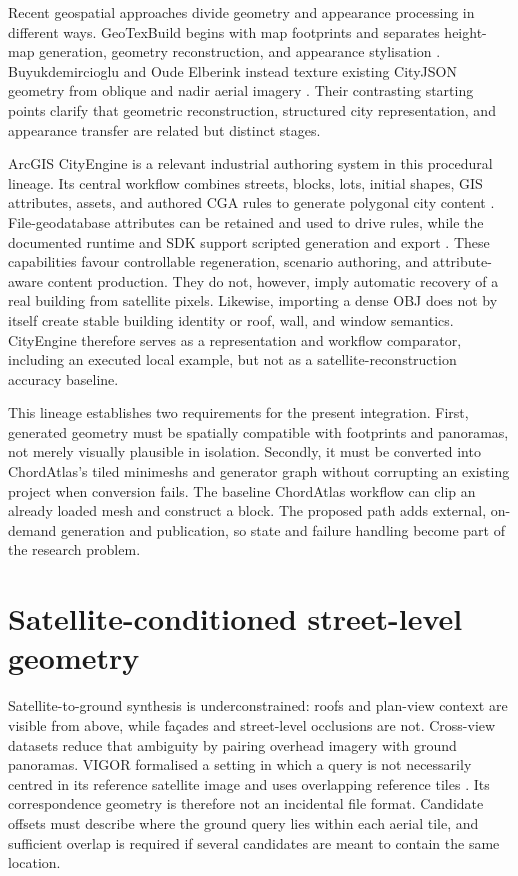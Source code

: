 Recent geospatial approaches divide geometry and appearance processing in
different ways.  GeoTexBuild begins with map footprints and separates
height-map generation, geometry reconstruction, and appearance stylisation
\cite{wang2025geotexbuild}.  Buyukdemircioglu and Oude Elberink instead texture
existing CityJSON geometry from oblique and nadir aerial imagery
\cite{buyukdemircioglu2024texture}.  Their contrasting starting points clarify
that geometric reconstruction, structured city representation, and appearance
transfer are related but distinct stages.

ArcGIS CityEngine is a relevant industrial authoring system in this procedural
lineage.  Its central workflow combines streets, blocks, lots, initial shapes,
GIS attributes, assets, and authored CGA rules to generate polygonal city
content \cite{esriCityEngineIntro2026}.  File-geodatabase attributes can be
retained and used to drive rules, while the documented runtime and SDK support
scripted generation and export \cite{esriCityEngineGIS2026,
esriCityEngineSDK2026}.  These capabilities favour controllable regeneration,
scenario authoring, and attribute-aware content production.  They do not,
however, imply automatic recovery of a real building from satellite pixels.
Likewise, importing a dense OBJ does not by itself create stable building
identity or roof, wall, and window semantics.  CityEngine therefore serves as
a representation and workflow comparator, including an executed local
example, but not as a satellite-reconstruction accuracy baseline.

This lineage establishes two requirements for the present integration.  First,
generated geometry must be spatially compatible with footprints and panoramas,
not merely visually plausible in isolation.  Secondly, it must be converted
into ChordAtlas's tiled \glspl{minimesh} and generator graph without corrupting
an existing project when conversion fails.  The baseline ChordAtlas workflow
can clip an already loaded mesh and construct a block.  The proposed path adds
external, on-demand generation and publication, so state and failure handling
become part of the research problem.

\section{Satellite-conditioned street-level geometry}

Satellite-to-ground synthesis is underconstrained: roofs and plan-view context
are visible from above, while fa\c{c}ades and street-level occlusions are not.
Cross-view datasets reduce that ambiguity by pairing overhead imagery with
ground panoramas.  VIGOR formalised a setting in which a query is not
necessarily centred in its reference satellite image and uses overlapping
reference tiles \cite{zhu2021vigor}.  Its correspondence geometry is therefore
not an incidental file format.  Candidate offsets must describe where the
ground query lies within each aerial tile, and sufficient overlap is required
if several candidates are meant to contain the same location.

